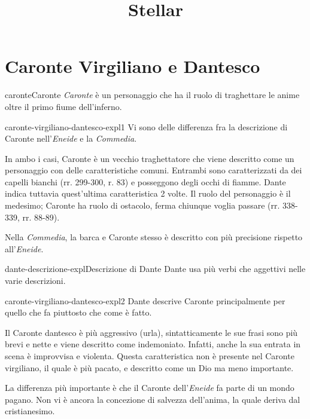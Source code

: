 \documentclass[preview]{standalone}
\begin{document}
\title{Stellar}
\genpage

\section{Caronte Virgiliano e Dantesco}

\begin{snippetcharacter}{caronte}{Caronte}
    \textit{Caronte} è un personaggio che ha il ruolo di traghettare le anime
    oltre il primo fiume dell'inferno.
\end{snippetcharacter}

\begin{snippet}{caronte-virgiliano-dantesco-expl1}
    Vi sono delle differenza fra la descrizione di Caronte nell'\textit{Eneide}
    e la \textit{Commedia}.
    
    In ambo i casi, Caronte è un vecchio traghettatore che viene descritto come un personaggio con
    delle caratteristiche comuni.
    Entrambi sono caratterizzati da dei capelli bianchi (rr. 299-300, r. 83) e posseggono
    degli occhi di fiamme. Dante indica tuttavia quest'ultima caratteristica 2 volte.
    Il ruolo del personaggio è il medesimo; Caronte ha ruolo di ostacolo, ferma chiunque voglia passare
    (rr. 338-339, rr. 88-89).
    
    Nella \textit{Commedia}, la barca e Caronte stesso è descritto con più precisione
    rispetto all'\textit{Eneide}.
\end{snippet}

\begin{snippetnote}{dante-descrizione-expl}{Descrizione di Dante}
    Dante usa più verbi che aggettivi nelle varie descrizioni.
\end{snippetnote}

\begin{snippet}{caronte-virgiliano-dantesco-expl2}
    Dante descrive Caronte principalmente per quello che fa piuttosto che come è fatto.
    
    Il Caronte dantesco è più aggressivo (urla), sintatticamente le sue frasi sono
    più brevi e nette e viene descritto come indemoniato. Infatti, anche la sua entrata in scena
    è improvvisa e violenta. Questa caratteristica non è presente nel Caronte virgiliano,
    il quale è più pacato, e descritto come un Dio ma meno importante.
    
    La differenza più importante è che il Caronte dell'\textit{Eneide} fa parte di un mondo pagano.
    Non vi è ancora la concezione di salvezza dell'anima, la quale deriva dal cristianesimo.
\end{snippet}
\end{document}
